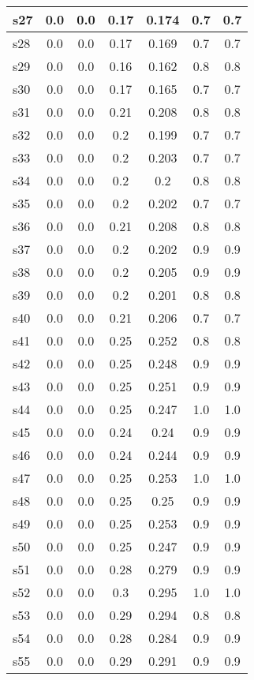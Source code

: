 \documentclass{article}
\begin{document}
\begin{tabular}{|l|c|c|c|c|c|c|}
s27 &0.0 & 0.0 & 0.17 & 0.174 & 0.7 & 0.7\\
\hline
s28 &0.0 & 0.0 & 0.17 & 0.169 & 0.7 & 0.7\\
\hline
s29 &0.0 & 0.0 & 0.16 & 0.162 & 0.8 & 0.8\\
\hline
s30 &0.0 & 0.0 & 0.17 & 0.165 & 0.7 & 0.7\\
\hline
s31 &0.0 & 0.0 & 0.21 & 0.208 & 0.8 & 0.8\\
\hline
s32 &0.0 & 0.0 & 0.2 & 0.199 & 0.7 & 0.7\\
\hline
s33 &0.0 & 0.0 & 0.2 & 0.203 & 0.7 & 0.7\\
\hline
s34 &0.0 & 0.0 & 0.2 & 0.2 & 0.8 & 0.8\\
\hline
s35 &0.0 & 0.0 & 0.2 & 0.202 & 0.7 & 0.7\\
\hline
s36 &0.0 & 0.0 & 0.21 & 0.208 & 0.8 & 0.8\\
\hline
s37 &0.0 & 0.0 & 0.2 & 0.202 & 0.9 & 0.9\\
\hline
s38 &0.0 & 0.0 & 0.2 & 0.205 & 0.9 & 0.9\\
\hline
s39 &0.0 & 0.0 & 0.2 & 0.201 & 0.8 & 0.8\\
\hline
s40 &0.0 & 0.0 & 0.21 & 0.206 & 0.7 & 0.7\\
\hline
s41 &0.0 & 0.0 & 0.25 & 0.252 & 0.8 & 0.8\\
\hline
s42 &0.0 & 0.0 & 0.25 & 0.248 & 0.9 & 0.9\\
\hline
s43 &0.0 & 0.0 & 0.25 & 0.251 & 0.9 & 0.9\\
\hline
s44 &0.0 & 0.0 & 0.25 & 0.247 & 1.0 & 1.0\\
\hline
s45 &0.0 & 0.0 & 0.24 & 0.24 & 0.9 & 0.9\\
\hline
s46 &0.0 & 0.0 & 0.24 & 0.244 & 0.9 & 0.9\\
\hline
s47 &0.0 & 0.0 & 0.25 & 0.253 & 1.0 & 1.0\\
\hline
s48 &0.0 & 0.0 & 0.25 & 0.25 & 0.9 & 0.9\\
\hline
s49 &0.0 & 0.0 & 0.25 & 0.253 & 0.9 & 0.9\\
\hline
s50 &0.0 & 0.0 & 0.25 & 0.247 & 0.9 & 0.9\\
\hline
s51 &0.0 & 0.0 & 0.28 & 0.279 & 0.9 & 0.9\\
\hline
s52 &0.0 & 0.0 & 0.3 & 0.295 & 1.0 & 1.0\\
\hline
s53 &0.0 & 0.0 & 0.29 & 0.294 & 0.8 & 0.8\\
\hline
s54 &0.0 & 0.0 & 0.28 & 0.284 & 0.9 & 0.9\\
\hline
s55 &0.0 & 0.0 & 0.29 & 0.291 & 0.9 & 0.9\\

\end{tabular}
\end{document}
